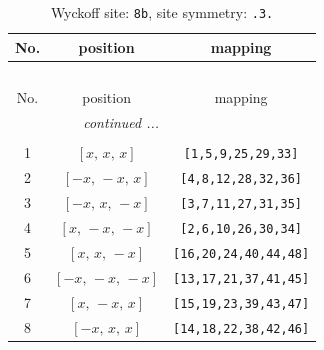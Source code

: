 \documentclass[fleqn,8pt]{jsarticle}
\begin{document}
\renewcommand{\arraystretch}{1.2}
\begin{longtable}{ccc}
\caption{Wyckoff site: {\tt 8b}, site symmetry: {\tt .3.}}
 \\
 \hline \hline
No. & position & mapping \\ \hline \endfirsthead

\multicolumn{2}{l}{\tablename\ \thetable{}} \\
 \hline \hline
No. & position & mapping \\ \hline \endhead

 \hline \hline
\multicolumn{2}{r}{\footnotesize\it continued ...} \\ \endfoot

 \hline \hline
\multicolumn{2}{r}{} \\ \endlastfoot

1 & $\left[ x,\, x,\, x \right]$ & {\tt [1,5,9,25,29,33]} \\ \hline
2 & $\left[ - x,\, - x,\, x \right]$ & {\tt [4,8,12,28,32,36]} \\ \hline
3 & $\left[ - x,\, x,\, - x \right]$ & {\tt [3,7,11,27,31,35]} \\ \hline
4 & $\left[ x,\, - x,\, - x \right]$ & {\tt [2,6,10,26,30,34]} \\ \hline
5 & $\left[ x,\, x,\, - x \right]$ & {\tt [16,20,24,40,44,48]} \\ \hline
6 & $\left[ - x,\, - x,\, - x \right]$ & {\tt [13,17,21,37,41,45]} \\ \hline
7 & $\left[ x,\, - x,\, x \right]$ & {\tt [15,19,23,39,43,47]} \\ \hline
8 & $\left[ - x,\, x,\, x \right]$ & {\tt [14,18,22,38,42,46]} \\
\end{longtable}
\renewcommand{\arraystretch}{1.2}
\end{document}
